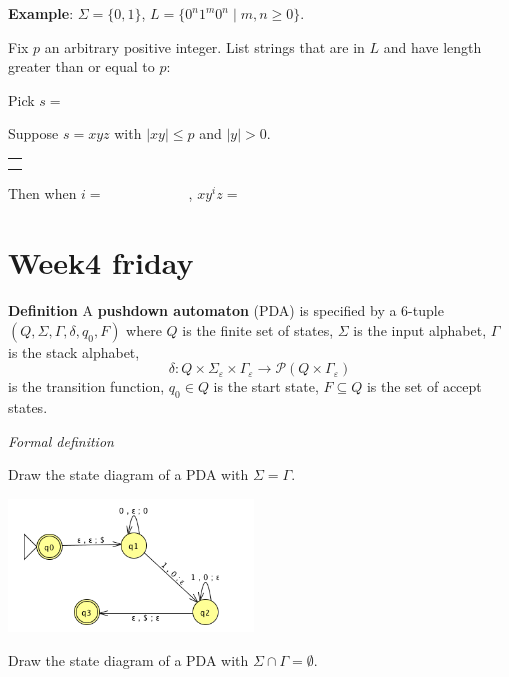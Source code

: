 \documentclass[12pt, oneside]{article}
\begin{document}
\vspace{30pt} 

{\bf Example}: $\Sigma  =  \{0,1\}$, $L = \{0^n1^m0^n  \mid m,n  \geq 0\}$.

Fix $p$ an arbitrary positive integer. List strings that are in $L$ and have length  greater than or equal  to $p$:

\vspace{10pt}

Pick $s = $


Suppose $s = xyz$ with  $|xy|  \leq  p$ and $|y| > 0$.
\begin{center}
\begin{tabular}{|c|}
\hline
 \\
\hspace{4in} \\
\hline
\end{tabular}
\end{center}
Then when $i = \hspace{1in}$, $xy^i z  = \hspace{1in}$
 \vfill
\section*{Week4 friday}


{\bf Definition} A {\bf pushdown automaton} (PDA) is  specified by a  $6$-tuple $(Q, \Sigma, \Gamma, \delta, q_0, F)$
where $Q$ is the finite set of states, $\Sigma$ is the input alphabet,  $\Gamma$ is the stack alphabet,
\[
    \delta: Q \times \Sigma_\varepsilon  \times  \Gamma_\varepsilon \to \mathcal{P}( Q \times \Gamma_\varepsilon)
\]
is the transition function,  $q_0 \in Q$ is the start state, $F \subseteq  Q$ is the set of accept states.
    
\begin{multicols}{2}
    {\it Formal definition}
    
    \vspace{90pt}
    Draw the state diagram of a PDA with $\Sigma = \Gamma$.
    
    \columnbreak 
    \includegraphics[height=100pt]{resources/machines/Lect9PDA.png}
    
    
    Draw the state diagram of a PDA with $\Sigma \cap \Gamma = \emptyset$.
    
\end{multicols}
    
\end{document}
